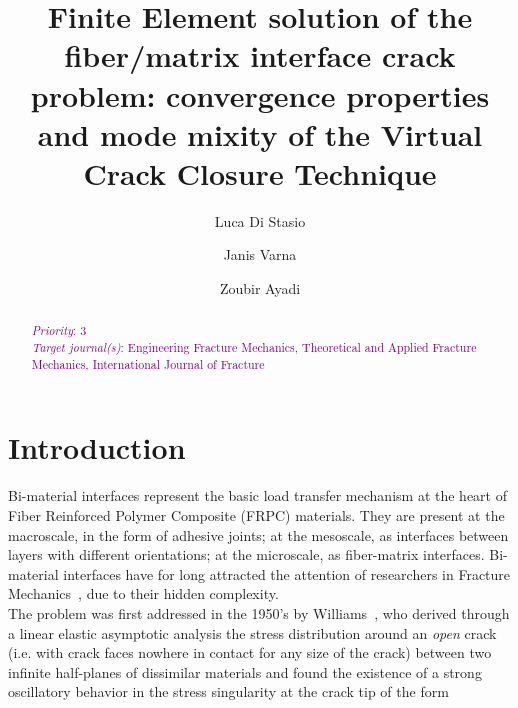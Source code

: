 \documentclass[review]{elsarticle}
\begin{document}
\begin{frontmatter}

\title{Finite Element solution of the fiber/matrix interface crack problem: convergence properties and mode mixity of the Virtual Crack Closure Technique}


\author[nancy,lulea]{Luca Di Stasio}
\author[lulea]{Janis Varna}
\author[nancy]{Zoubir Ayadi}


\address[nancy]{Universit\'e de Lorraine, EEIGM, IJL, 6 Rue Bastien Lepage, F-54010 Nancy, France}
\address[lulea]{Lule\aa\ University of Technology, University Campus, SE-97187 Lule\aa, Sweden}

\begin{abstract}
\noindent
\textcolor{purple}{{\em Priority}: 3}\\
\textcolor{purple}{{\em Target journal(s)}: Engineering Fracture Mechanics, Theoretical and Applied Fracture Mechanics, International Journal of Fracture}\\
\end{abstract}


\end{frontmatter}

\linenumbers

\section{Introduction}

Bi-material interfaces represent the basic load transfer mechanism at the heart of Fiber Reinforced Polymer Composite (FRPC) materials. They are present at the macroscale, in the form of adhesive joints; at the mesoscale, as interfaces between layers with different orientations; at the microscale, as fiber-matrix interfaces. Bi-material interfaces have for long attracted the attention of researchers in Fracture Mechanics~\cite{Comninou1990,Hills1993}, due to their hidden complexity.\\
The problem was first addressed in the 1950's by Williams~\cite{Williams1959}, who derived through a linear elastic asymptotic analysis the stress distribution around an \emph{open} crack (i.e. with crack faces nowhere in contact for any size of the crack) between two infinite half-planes of dissimilar materials and found the existence of a strong oscillatory behavior in the stress singularity at the crack tip of the form 
\end{document}
